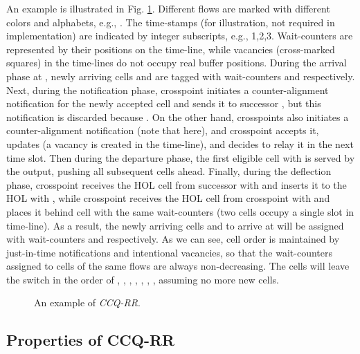 \documentclass[journal,final,doublecolumn,10pt,twoside]{IEEEtranTCOM} \normalsize
\begin{document}
An example is illustrated in Fig. \ref{fig:exampleIII}. Different flows are marked with different colors and alphabets, e.g., . The time-stamps (for illustration, not required in implementation) are indicated by integer subscripts, e.g., 1,2,3. Wait-counters are represented by their positions on the time-line, while vacancies (cross-marked squares) in the time-lines do not occupy real buffer positions.  During the arrival phase at , newly arriving cells  and  are tagged with wait-counters  and  respectively. Next, during the notification phase, crosspoint  initiates a counter-alignment notification  for the newly accepted cell  and sends it to successor , but this notification is discarded because . On the other hand, crosspoints  also initiates a counter-alignment notification  (note that  here), and crosspoint  accepts it, updates  (a vacancy is created in the time-line), and decides to relay it in the next time slot. Then during the departure phase, the first eligible cell  with  is served by the output, pushing all subsequent cells ahead. Finally, during the deflection phase, crosspoint  receives the HOL cell  from successor  with  and inserts it to the HOL with , while crosspoint  receives the HOL cell  from crosspoint  with  and places it behind cell  with the same wait-counters  (two cells occupy a single slot in time-line). As a result, the newly arriving cells  and  to arrive at  will be assigned with wait-counters  and  respectively. As we can see, cell order is maintained by just-in-time notifications and intentional vacancies, so that the wait-counters assigned to cells of the same flows are always non-decreasing. The cells will leave the switch in the order of , , , , , , , assuming no more new cells.



\begin{figure}[ht]
\begin{minipage}[t]{3.2 in}
\centering {}
\end{minipage}
\begin{minipage}[t]{3.2 in}
\centering {}
\end{minipage}
\caption{An example of \emph{CCQ-RR}.}
\label{fig:exampleIII}
\end{figure}

\subsection{Properties of CCQ-RR}
\label{sec:feature}
\end{document}
